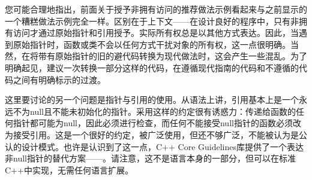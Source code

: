 您可能合理地指出，前面关于授予非拥有访问的推荐做法示例看起来与之前显示的一个糟糕做法示例完全一样。区别在于上下文——在设计良好的程序中，只有非拥有访问才通过原始指针和引用授予。实际所有权总是以其他方式表达。因此，当遇到原始指针时，函数或类不会以任何方式干扰对象的所有权，这一点很明确。当然，在将带有原始指针的旧的避代码转换为现代做法时，这会产生一些混乱。为了明确起见，建议一次转换一部分这样的代码，在遵循现代指南的代码和不遵循的代码之间有明确标示的过渡。

这里要讨论的另一个问题是指针与引用的使用。从语法上讲，引用基本上是一个永远不为null且不能未初始化的指针。采用这样的约定很有诱惑力：传递给函数的任何指针都可能为null，因此必须进行检查，而任何不能接受null指针的函数必须改为接受引用。这是一个很好的约定，被广泛使用，但还不够广泛，不能被认为是公认的设计模式。也许是认识到了这一点，C++ Core Guidelines库提供了一个表达非null指针的替代方案——。请注意，这不是语言本身的一部分，但可以在标准C++中实现，无需任何语言扩展。

